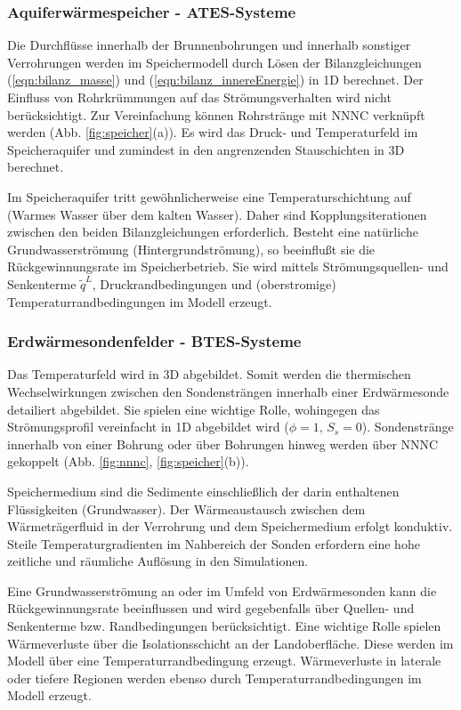 \documentclass[12pt, a4paper, twoside, titlepage]{article}
\begin{document}
%
\subsubsection{Aquiferw\" armespeicher - ATES-Systeme}
%
%
Die Durchfl\" usse innerhalb der Brunnenbohrungen und innerhalb sonstiger Verrohrungen werden im Speichermodell durch L\" osen der Bilanzgleichungen (\ref{eqn:bilanz_masse}) und (\ref{eqn:bilanz_innereEnergie}) in 1D berechnet.
%
Der Einfluss von Rohrkr\" ummungen auf das Str\" omungsverhalten wird nicht ber\" ucksichtigt.
%
Zur Vereinfachung k\" onnen Rohrstr\" ange mit NNNC verkn\" upft werden (Abb. \ref{fig:speicher}(a)). 
%
Es wird das Druck- und Temperaturfeld im Speicheraquifer und zumindest in den angrenzenden Stauschichten in 3D berechnet.
%


%
Im Speicheraquifer tritt gew\" ohnlicherweise eine Temperaturschichtung auf (Warmes Wasser \" uber dem kalten Wasser).
%
Daher sind Kopplungsiterationen zwischen den beiden Bilanzgleichungen erforderlich.
%
Besteht eine nat\" urliche Grundwasserstr\" omung (Hintergrundstr\" omung), so beeinflu\ss t sie die R\" uckgewinnungsrate im Speicherbetrieb.
%
Sie wird mittels Str\" omungsquellen- und Senkenterme $\tilde q^L$, Druckrandbedingungen und (oberstromige) Temperaturrandbedingungen im Modell erzeugt.
%
 
%
\subsubsection{Erdw\" armesondenfelder - BTES-Systeme}
%
%
Das Temperaturfeld wird in 3D abgebildet.
%
Somit werden die thermischen Wechselwirkungen zwischen den Sondenstr\" angen innerhalb einer Erdw\" armesonde detailiert abgebildet. 
%
Sie spielen eine wichtige Rolle, wohingegen das Str\" omungsprofil vereinfacht in 1D abgebildet wird ($\phi = 1$, $S_s = 0$).
%
Sondenstr\" ange innerhalb von einer Bohrung oder \" uber Bohrungen hinweg werden \" uber NNNC gekoppelt (Abb. \ref{fig:nnnc}, \ref{fig:speicher}(b)).

%
Speichermedium sind die Sedimente einschlie\ss lich der darin enthaltenen Fl\" ussigkeiten (Grundwasser).
%
Der W\" armeaustausch zwischen dem W\" armetr\" agerfluid in der Verrohrung und dem Speichermedium erfolgt konduktiv.
%
Steile Temperaturgradienten im Nahbereich der Sonden erfordern eine hohe zeitliche und r\" aumliche Aufl\" osung in den Simulationen.
%

%
Eine Grundwasserstr\" omung an oder im Umfeld von Erdw\" armesonden kann die R\" uckgewinnungsrate beeinflussen und wird gegebenfalls \" uber Quellen- und Senkenterme bzw. Randbedingungen ber\" ucksichtigt.
%
Eine wichtige Rolle spielen W\" armeverluste \" uber die Isolationsschicht an der Landoberfl\" ache.
%
Diese werden im Modell \" uber eine Temperaturrandbedingung erzeugt.
%
W\" armeverluste in laterale oder tiefere Regionen werden ebenso durch Temperaturrandbedingungen im Modell erzeugt. 
 
\end{document}
